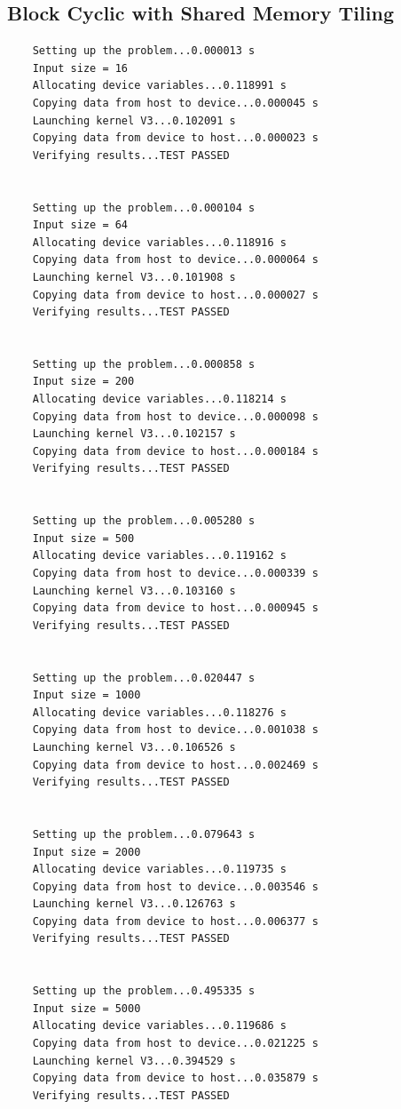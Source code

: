 \documentclass{article}
\begin{document}
\subsection{Block Cyclic with Shared Memory Tiling}
\begin{verbatim}
	Setting up the problem...0.000013 s
	Input size = 16
	Allocating device variables...0.118991 s
	Copying data from host to device...0.000045 s
	Launching kernel V3...0.102091 s
	Copying data from device to host...0.000023 s
	Verifying results...TEST PASSED
	
	
	Setting up the problem...0.000104 s
	Input size = 64
	Allocating device variables...0.118916 s
	Copying data from host to device...0.000064 s
	Launching kernel V3...0.101908 s
	Copying data from device to host...0.000027 s
	Verifying results...TEST PASSED
	
	
	Setting up the problem...0.000858 s
	Input size = 200
	Allocating device variables...0.118214 s
	Copying data from host to device...0.000098 s
	Launching kernel V3...0.102157 s
	Copying data from device to host...0.000184 s
	Verifying results...TEST PASSED
	
	
	Setting up the problem...0.005280 s
	Input size = 500
	Allocating device variables...0.119162 s
	Copying data from host to device...0.000339 s
	Launching kernel V3...0.103160 s
	Copying data from device to host...0.000945 s
	Verifying results...TEST PASSED
	
	
	Setting up the problem...0.020447 s
	Input size = 1000
	Allocating device variables...0.118276 s
	Copying data from host to device...0.001038 s
	Launching kernel V3...0.106526 s
	Copying data from device to host...0.002469 s
	Verifying results...TEST PASSED
	
	
	Setting up the problem...0.079643 s
	Input size = 2000
	Allocating device variables...0.119735 s
	Copying data from host to device...0.003546 s
	Launching kernel V3...0.126763 s
	Copying data from device to host...0.006377 s
	Verifying results...TEST PASSED
	
	
	Setting up the problem...0.495335 s
	Input size = 5000
	Allocating device variables...0.119686 s
	Copying data from host to device...0.021225 s
	Launching kernel V3...0.394529 s
	Copying data from device to host...0.035879 s
	Verifying results...TEST PASSED
\end{verbatim}
\end{document}
